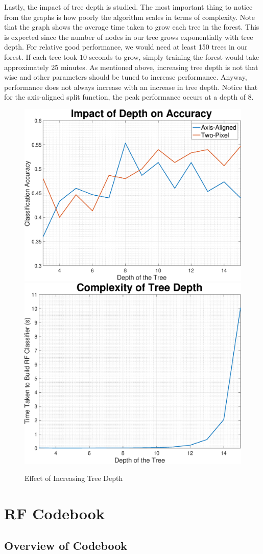\documentclass[a4paper,pra,twocolumn,10pt,aps,longbibliography,nobalancelastpage]{article}
\begin{document}
Lastly, the impact of tree depth is studied. The most important thing to notice from the graphs is how poorly the algorithm scales in terms of complexity. Note that the graph shows the average time taken to grow each tree in the forest. This is expected since the number of nodes in our tree grows exponentially with tree depth. For relative good performance, we would need at least 150 trees in our forest. If each tree took $10$ seconds to grow, simply training the forest would take approximately 25 minutes. As mentioned above, increasing tree depth is not that wise and other parameters should be tuned to increase performance. Anyway, performance does not always increase with an increase in tree depth. Notice that for the axis-aligned split function, the peak performance occurs at a depth of 8. 

\begin{figure}[H]
	\centering
    \includegraphics[width=0.49\columnwidth]{depth_acc}
	\includegraphics[width=0.49\columnwidth]{depth_complexity}
    \caption{Effect of Increasing Tree Depth}
\end{figure}

\section{RF Codebook}

\subsection{Overview of Codebook}
\end{document}
